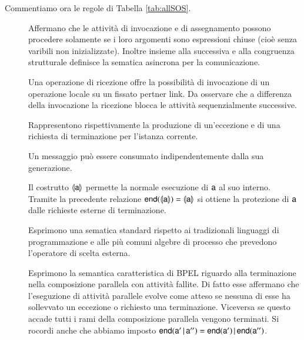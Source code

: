 Commentiamo ora le regole di Tabella \ref{tab:allSOS}.
\begin{description}
  \item[ ] 
  Affermano che le attività di invocazione e di assegnamento
  possono procedere solamente se i loro argomenti sono espressioni
  chiuse (cioè senza varibili non inizializzate). Inoltre  insieme 
  alla successiva  e alla congruenza strutturale
  definisce la sematica asincrona per la comunicazione.
   
  \item[] Una operazione di ricezione offre la
  possibilità  di invocazione di un operazione locale su un fissato pertner
  link. Da osservare che a differenza della invocazione la ricezione blocca le
  attività sequenzialmente successive.
  
  \item[ ] Rappresentono
  rispettivamente la produzione di un'eccezione e di una richiesta di
  terminazione per l'istanza corrente.
  
  \item[] Un messaggio può essere consumato
  indipendentemente dalla sua generazione.
  
  \item[] Il costrutto $\llparenthesis {\sf a}\rrparenthesis$ permette la
  normale esecuzione di ${\sf a}$ al suo interno. Tramite la precedente relazione
  ${\sf end}(\llparenthesis {\sf a}\rrparenthesis)=\llparenthesis {\sf a}\rrparenthesis$ si ottiene la protezione di ${\sf a}$
  dalle richieste esterne di terminazione.
 
  \item[  
  ] Esprimono una sematica standard rispetto ai
  tradizionali linguaggi di programmazione e alle più comuni algebre di
  processo che prevedono l'operatore di scelta esterna.
  
  
  \item[ ] Esprimono la semantica
  caratteristica di BPEL riguardo alla terminazione nella composizione
  parallela con attività fallite. Di fatto esse affermano che l'eseguzione di
  attività parallele evolve come atteso se nessuna di esse ha sollevvato un
  eccezione o richiesto una terminazione. Viceversa se questo accade tutti i
  rami della composizione parallela vengono terminati. Si rocordi anche che
  abbiamo imposto ${\sf end}( {\sf a}' \,|\, {\sf a}'' ) =  {\sf end}({\sf a}') \,|\,
  {\sf end}({\sf a}'')$.
  

\end{description}
